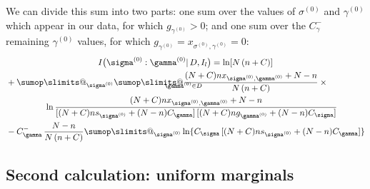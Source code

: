 \documentclass[\ifafour a4paper,12pt,\else a5paper,10pt,\fi%
onecolumn,oneside,article,%
british%
]{memoir}
\makeatletter
\theoremstyle{remark}
\theoremstyle{innote}
\def\sum{\DOTSI\sumop\slimits@}
\newcommand*{\citep}{\parencites}
\DeclarePairedDelimiter\set{\{}{\}}
\renewcommand*{\|}{\mathpunct{|}}
\newcommand*{\sect}{\S}%
\newcommand*{\puzzle}{\maltese}
\newcommand{\mynote}[1]{ {\color{notecolour}\puzzle\ #1}}
\newcommand*{\dob}{degree of belief}
\newcommand*{\yD}{D}
\newcommand*{\mI}{I}
\newcommand*{\ys}{\sigma}
\newcommand*{\yg}{\gamma}
\newcommand*{\gn}{l}
\newcommand*{\ysi}[1]{\ys^{(#1)}}
\newcommand*{\ygi}[1]{\yg^{(#1)}}
\newcommand*{\yso}{\ysi{0}}
\newcommand*{\ygo}{\ygi{0}}
\newcommand*{\yCs}{C_{\sigma}}
\newcommand*{\yCg}{C_{\gamma}}
\newcommand*{\yIc}{I_{\gn}}
\newcommand*{\yCgn}{\yCg^{-}}
\makeatother
\begin{document}
We can divide this sum into two parts: one sum over the values of $\yso$
and $\ygo$ which appear in our data, for which $g_{\ygo}>0$; and one sum
over the $\yCgn$ remaining $\ygo$ values,  for which $g_{\ygo}=x_{\yso,\ygo}=0$:
\begin{multline}
  \label{eq:mutual_info_final_three}
  \mI\bigl( \yso : \ygo \| \yD,\yIc \bigr) =
  \ln[N\,(n+C)] \\
  \begin{aligned}[b]
  &+
    \!\begin{multlined}[t][0.92\linewidth]
\sum_{\yso}
\sum_{\mathclap{\ygo \in \yD}}
  \frac{(N+C) n x_{\yso, \ygo}+N-n}{N\,(n+C)}\times{}\\
  \ln\frac{(N+C) n x_{\yso, \ygo}+N-n}{
    [(N+C) n s_{\yso}+(N-n)\yCg]\,
    [(N+C) n g_{\ygo}+(N-n)\yCs]
  } 
\end{multlined}
    \\
    &-\yCgn\,
      \frac{N-n}{N\,(n+C)}\sum_{\yso}\ln\{\yCs\,[(N+C) n s_{\yso}+(N-n)\yCg]\}
  \end{aligned}
\end{multline}

\subsection{Second calculation: uniform marginals}
\label{sec:2nd_calculation_unif_marginals}

\end{document}
